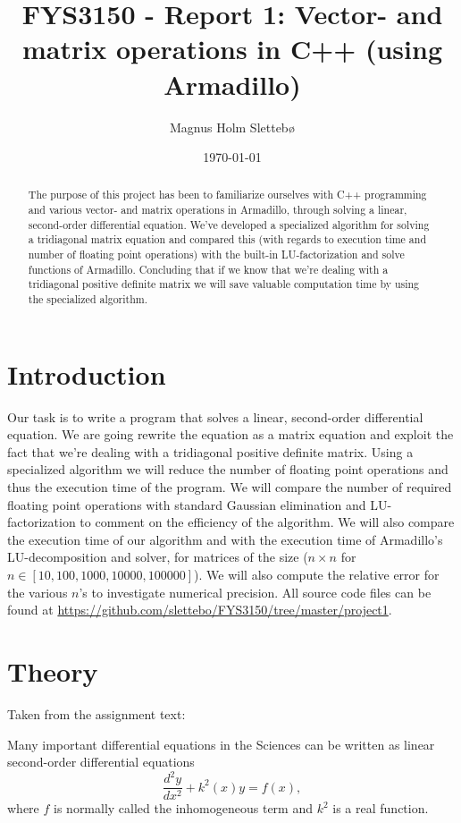 \documentclass[norsk,a4paper,12pt]{article}
\title{FYS3150 - Report 1: Vector- and matrix operations in C++ (using Armadillo)}
\author{Magnus Holm Slettebø}
\date{\today}
\begin{document}
\maketitle

\begin{abstract}
The purpose of this project has been to familiarize ourselves with C++ programming and various vector- and matrix operations in Armadillo, through solving a linear, second-order differential equation. We've developed a specialized algorithm for solving a tridiagonal matrix equation and compared this (with regards to execution time and number of floating point operations) with the built-in LU-factorization and solve functions of Armadillo. Concluding that if we know that we're dealing with a tridiagonal positive definite matrix we will save valuable computation time by using the specialized algorithm.
\end{abstract}


\section{Introduction}
Our task is to write a program that solves a linear, second-order differential equation. We are going rewrite the equation as a matrix equation and exploit the fact that we're dealing with a tridiagonal positive definite matrix. Using a specialized algorithm we will reduce the number of floating point operations and thus the execution time of the program. We will compare the number of required floating point operations with standard Gaussian elimination and LU-factorization to comment on the efficiency of the algorithm. We will also compare the execution time of our algorithm and with the execution time of Armadillo's LU-decomposition and solver, for matrices of the size ($n \times n$ for $n \in [10,100,1000,10000,100000]$). We will also compute the relative error for the various $n$'s to investigate numerical precision. All source code files can be found at \url{https://github.com/slettebo/FYS3150/tree/master/project1}.


\section{Theory}
Taken from the assignment text:

Many important differential equations in the Sciences can be written as 
linear second-order differential equations 
\[
\frac{d^2y}{dx^2}+k^2(x)y = f(x),
\]
where $f$ is normally called the inhomogeneous term and $k^2$ is a real function.
\end{document}

